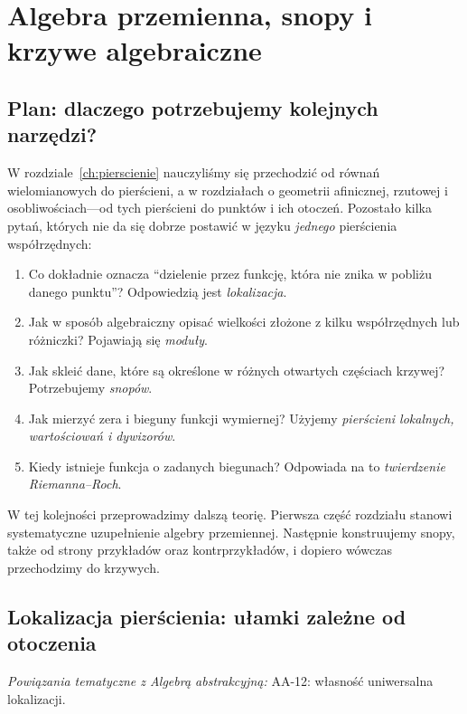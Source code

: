 \documentclass[11pt,a4paper,openany]{report}
\numberwithin{equation}{section}
\theoremstyle{plain}
\theoremstyle{definition}
\theoremstyle{remark}
\begin{document}

\chapter{Algebra przemienna, snopy i krzywe algebraiczne}
\label{ch:krzywe-snopy}

\providecommand{\atlasref}[2]{#2}


\section{Plan: dlaczego potrzebujemy kolejnych narzędzi?}
\label{sec:plan-krzywe}
W rozdziale~\ref{ch:pierscienie} nauczyliśmy się przechodzić od równań
wielomianowych do pierścieni, a w rozdziałach o geometrii afinicznej,
rzutowej i osobliwościach---od tych pierścieni do punktów i ich
otoczeń. Pozostało kilka pytań, których nie da się dobrze postawić
w języku \emph{jednego} pierścienia współrzędnych:
\begin{enumerate}[label=\arabic*)]
\item Co dokładnie oznacza ``dzielenie przez funkcję, która nie znika
w pobliżu danego punktu''? Odpowiedzią jest \emph{lokalizacja}.
\item Jak w sposób algebraiczny opisać wielkości złożone z kilku
współrzędnych lub różniczki? Pojawiają się \emph{moduły}.
\item Jak skleić dane, które są określone w różnych otwartych częściach
krzywej? Potrzebujemy \emph{snopów}.
\item Jak mierzyć zera i bieguny funkcji wymiernej? Użyjemy
\emph{pierścieni lokalnych, wartościowań i dywizorów}.
\item Kiedy istnieje funkcja o zadanych biegunach? Odpowiada na to
\emph{twierdzenie Riemanna--Roch}.
\end{enumerate}
W tej kolejności przeprowadzimy dalszą teorię. Pierwsza część
rozdziału stanowi systematyczne uzupełnienie algebry przemiennej.
Następnie konstruujemy snopy, także od strony przykładów oraz
kontrprzykładów, i dopiero wówczas przechodzimy do krzywych.

\section{Lokalizacja pierścienia: ułamki zależne od otoczenia}
\label{sec:lokalizacja}

\noindent\emph{Powiązania tematyczne z Algebrą abstrakcyjną:} \atlasref{AA-12::aa:tw:localization-universal}{AA-12: własność uniwersalna lokalizacji}.
\end{document}
